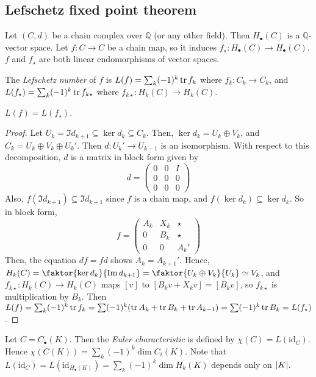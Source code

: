 \subsection{Lefschetz fixed point theorem}
Let \( (C, d) \) be a chain complex over \( \mathbb Q \) (or any other field).
Then \( H_\bullet(C) \) is a \( \mathbb Q \)-vector space.
Let \( f \colon C \to C \) be a chain map, so it induces \( f_\star \colon H_\bullet(C) \to H_\bullet(C) \).
\( f \) and \( f_\star \) are both linear endomorphisms of vector spaces.
\begin{definition}
	The \emph{Lefschetz number} of \( f \) is \( L(f) = \sum_k (-1)^k \tr f_k \) where \( f_k \colon C_k \to C_k \), and \( L(f_\star) = \sum_k (-1)^k \tr f_{k\star} \) where \( f_{k\star} \colon H_k(C) \to H_k(C) \).
\end{definition}
\begin{proposition}
	\( L(f) = L(f_\star) \).
\end{proposition}
\begin{proof}
	Let \( U_k = \Im d_{k+1} \subseteq \ker d_k \subseteq C_k \).
	Then, \( \ker d_k = U_k \oplus V_k \), and \( C_k = U_k \oplus V_k \oplus U_k' \).
	Then \( d \colon U_k' \to U_{k-1} \) is an isomorphism.
	With respect to this decomposition, \( d \) is a matrix in block form given by
	\[ d = \begin{pmatrix}
		0 & 0 & I \\
		0 & 0 & 0 \\
		0 & 0 & 0
	\end{pmatrix} \]
	Also, \( f(\Im d_{k+1}) \subseteq \Im d_{k+1} \) since \( f \) is a chain map, and \( f(\ker d_k) \subseteq \ker d_k \).
	So in block form,
	\[ f = \begin{pmatrix}
		A_k & X_k & \star \\
		0 & B_k & \star \\
		0 & 0 & A_k'
	\end{pmatrix} \]
	Then, the equation \( df = fd \) shows \( A_k = A_{k+1}' \).
	Hence, \( H_k(C) = \faktor{\ker d_k}{\Im d_{k+1}} = \faktor{U_k \oplus V_k}{U_k} \simeq V_k \), and \( f_{k\star} \colon H_k(C) \to H_k(C) \) maps \( [v] \) to \( [B_k v + X_k v] = [B_k v] \), so \( f_{k\star} \) is multiplication by \( B_k \).
	Then \( L(f) = \sum_k (-1)^k \tr f_k = \sum (-1)^k (\tr A_k + \tr B_k + \tr A_{k-1}) = \sum (-1)^k \tr B_k = L(f_\star) \).
\end{proof}
\begin{definition}
	Let \( C = C_\bullet(K) \).
	Then the \emph{Euler characteristic} is defined by \( \chi(C) = L(\mathrm{id}_C) \).
	Hence \( \chi(C(K)) = \sum_k (-1)^k \dim C_i(K) \).
	Note that \( L(\mathrm{id}_C) = L(\mathrm{id}_{H_\bullet(K)}) = \sum_k (-1)^k \dim H_k(K) \) depends only on \( \abs{K} \).
\end{definition}

